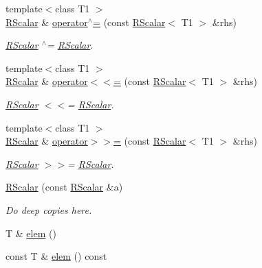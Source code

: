 \begin{DoxyCompactItemize}
{\footnotesize template$<$class T1 $>$ }\\\mbox{\hyperlink{classENSEM_1_1RScalar}{R\+Scalar}} \& \mbox{\hyperlink{classENSEM_1_1RScalar_ad69bdf7cec58f8ef8a8a42b250d97b25}{operator$^\wedge$=}} (const \mbox{\hyperlink{classENSEM_1_1RScalar}{R\+Scalar}}$<$ T1 $>$ \&rhs)
\begin{DoxyCompactList}\small\item\em \mbox{\hyperlink{classENSEM_1_1RScalar}{R\+Scalar}} $^\wedge$= \mbox{\hyperlink{classENSEM_1_1RScalar}{R\+Scalar}}. \end{DoxyCompactList}\item 
{\footnotesize template$<$class T1 $>$ }\\\mbox{\hyperlink{classENSEM_1_1RScalar}{R\+Scalar}} \& \mbox{\hyperlink{classENSEM_1_1RScalar_a4f12bedac2ac4848354e3c3018f6c9aa}{operator$<$$<$=}} (const \mbox{\hyperlink{classENSEM_1_1RScalar}{R\+Scalar}}$<$ T1 $>$ \&rhs)
\begin{DoxyCompactList}\small\item\em \mbox{\hyperlink{classENSEM_1_1RScalar}{R\+Scalar}} $<$$<$= \mbox{\hyperlink{classENSEM_1_1RScalar}{R\+Scalar}}. \end{DoxyCompactList}\item 
{\footnotesize template$<$class T1 $>$ }\\\mbox{\hyperlink{classENSEM_1_1RScalar}{R\+Scalar}} \& \mbox{\hyperlink{classENSEM_1_1RScalar_a35379cd7317c2c533aa26e3c15a9b03f}{operator$>$$>$=}} (const \mbox{\hyperlink{classENSEM_1_1RScalar}{R\+Scalar}}$<$ T1 $>$ \&rhs)
\begin{DoxyCompactList}\small\item\em \mbox{\hyperlink{classENSEM_1_1RScalar}{R\+Scalar}} $>$$>$= \mbox{\hyperlink{classENSEM_1_1RScalar}{R\+Scalar}}. \end{DoxyCompactList}\item 
\mbox{\hyperlink{classENSEM_1_1RScalar_a6aff5b3d3e105c89b56329e817eca759}{R\+Scalar}} (const \mbox{\hyperlink{classENSEM_1_1RScalar}{R\+Scalar}} \&a)
\begin{DoxyCompactList}\small\item\em Do deep copies here. \end{DoxyCompactList}\item 
T \& \mbox{\hyperlink{classENSEM_1_1RScalar_ac1e3c3dba2379fdcea237f7c2bbb1e0e}{elem}} ()
\item 
const T \& \mbox{\hyperlink{classENSEM_1_1RScalar_a26bfcd896407f15877920b5f737119fe}{elem}} () const
\end{DoxyCompactItemize}


